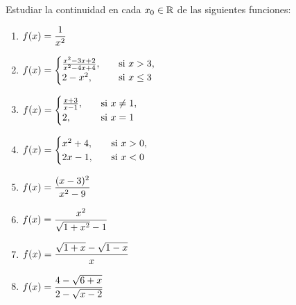 \item Estudiar la continuidad en cada $x_0\in\mathbb{R}$ de las siguientes funciones:
\begin{multicols}{2}
\begin{enumerate}
    \item $\displaystyle f(x)=\frac{1}{x^2}$
    \item $\displaystyle f(x)=\begin{cases}
        \frac{x^2-3x+2}{x^2-4x+4}, \quad&\text{si }x > 3,\\
        2-x^2, \quad&\text{si }x \le 3
    \end{cases}$
    \item $\displaystyle f(x)=\begin{cases}
        \frac{x+3}{x-1}, \quad&\text{si }x\neq 1,\\
        2, \quad&\text{si }x = 1
    \end{cases}$
    \item $\displaystyle f(x)=\begin{cases}
        x^2+4, \quad&\text{si }x > 0,\\
        2x-1, \quad&\text{si }x <0
    \end{cases}$
    \item $\displaystyle f(x)=\frac{(x-3)^2}{x^2-9}$
    \item $\displaystyle f(x)=\frac{x^2}{\sqrt{1+x^2}-1}$
    \item $\displaystyle f(x)=\frac{\sqrt{1+x}-\sqrt{1-x}}{x}$
    \item $\displaystyle f(x)=\frac{4-\sqrt{6+x}}{2-\sqrt{x-2}}$
\end{enumerate}
\end{multicols}

